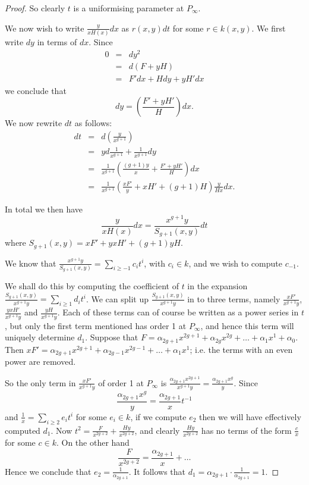 \documentclass[draft, 11pt]{article} %
\theoremstyle{plain}
\theoremstyle{remark}
\begin{document}
{\begin{proof}
So clearly $t$ is a uniformising parameter at $P_\infty$.

We now wish to write $\frac{y}{xH(x)}dx$ as $r(x,y)dt$ for some $r \in k(x,y)$.
We first write $dy$ in terms of $dx$.
Since
\begin{eqnarray*}
0 & = & dy^2 \\
& = & d(F+yH) \\
& = & F'dx + Hdy + yH'dx
\end{eqnarray*}
we conclude that
\[
dy = \left( \frac{F'+yH'}{H} \right) dx.
\]
We now rewrite $dt$ as follows:
\begin{eqnarray*}
dt & = & d\left( \frac{y}{x^{g+1}} \right) \\
& = & yd\frac{1}{x^{g+1}} + \frac{1}{x^{g+1}}dy \\
& = & \frac{1}{x^{g+1}} \left( \frac{(g+1)y}{x} + \frac{F'+yH'}{H} \right) dx \\
& = & \frac{1}{x^{g+1}} \left( \frac{xF'}{y} + xH' + (g+1)H \right) \frac{y}{Hx} dx.
\end{eqnarray*}

In total we then have
\[
\frac{y}{xH(x)}dx = \frac{x^{g+1}y}{S_{g+1}(x,y)}dt
\]
where $S_{g+1}(x,y) = xF' + yxH' + (g+1)yH$.

We know that $\frac{x^{g+1}y}{S_{g+1}(x,y)} = \sum_{i\geq -1} c_i t^i$, with $c_i \in k$, and we wish to compute $c_{-1}$.


We shall do this by computing the coefficient of $t$ in the expansion $\frac{S_{g+1}(x,y)}{x^{g+1}y} = \sum_{i\geq 1}d_it^i$.
We can split up $\frac{S_{g+1}(x,y)}{x^{g+1}y}$ in to three terms, namely $\frac{xF'}{x^{g+1}y}$, $\frac{yxH'}{x^{g+1}y}$ and $\frac{yH}{x^{g+1}y}$.
Each of these terms can of course be written as a power series in $t$, but only the first term mentioned has order 1 at $P_\infty$, and hence this term will uniquely determine $d_1$.
Suppose that $F = \alpha_{2g+1}x^{2g+1} + \alpha_{2g}x^{2g} + \ldots + \alpha_1x^1 + \alpha_0$.
Then $xF'= \alpha_{2g+1}x^{2g+1} + \alpha_{2g-1}x^{2g-1} + \ldots + \alpha_1x^1$; i.e. the terms with an even power are removed.

So the only term in $\frac{xF'}{x^{g+1}y}$ of order 1 at $P_\infty$ is $\frac{\alpha_{2g+1}x^{2g+1}}{x^{g+1}y} = \frac{\alpha_{2g+1}x^{g}}{y}$.
Since
\[
\frac{\alpha_{2g+1}x^g}{y} = \frac{\alpha_{2g+1}}{x}t^{-1}
\]
and $\frac{1}{x} = \sum_{i\geq 2}e_it^i$ for some $e_i \in k$, if we compute $e_2$ then we will have effectively computed $d_1$.
Now $t^2 = \frac{F }{x^{2g+2}}+ \frac{Hy}{x^{2g+2}}$, and clearly $\frac{Hy}{x^{2g+2}}$ has no terms of the form $\frac{c}{x}$ for some $c \in k$.
On the other hand
\[
\frac{F}{x^{2g+2}} = \frac{\alpha_{2g+1}}{x} + \ldots
\]
Hence we conclude that $e_2 = \frac{1}{\alpha_{2g+1}}$.
It follows that $d_1 = \alpha_{2g+1} \cdot \frac{1}{\alpha_{2g+1}} = 1$.



\end{proof}}
\end{document}
